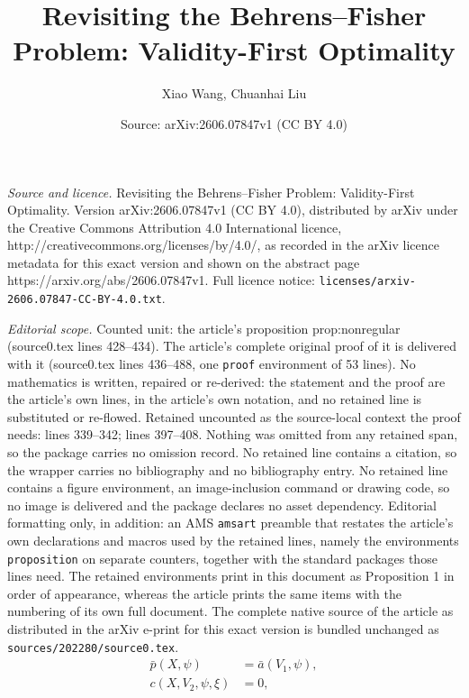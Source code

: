 \documentclass[10pt,a4paper]{amsart}
\title{Revisiting the Behrens--Fisher Problem: Validity-First Optimality}
\author{Xiao Wang, Chuanhai Liu}
\date{Source: arXiv:2606.07847v1 (CC BY 4.0)}
\begin{document}
\maketitle

\noindent\emph{Source and licence.} Revisiting the Behrens--Fisher Problem: Validity-First Optimality. Version arXiv:2606.07847v1 (CC BY 4.0), distributed by arXiv under the Creative Commons Attribution 4.0 International licence, http://creativecommons.org/licenses/by/4.0/, as recorded in the arXiv licence metadata for this exact version and shown on the abstract page https://arxiv.org/abs/2606.07847v1. Full licence notice: \texttt{licenses/arxiv-2606.07847-CC-BY-4.0.txt}.\par\smallskip

\noindent\textit{Editorial scope.} Counted unit: the article's proposition prop:nonregular (source0.tex lines 428--434). The article's complete original proof of it is delivered with it (source0.tex lines 436--488, one \texttt{proof} environment of 53 lines). No mathematics is written, repaired or re-derived: the statement and the proof are the article's own lines, in the article's own notation, and no retained line is substituted or re-flowed.  Retained uncounted as the source-local context the proof needs: lines 339--342; lines 397--408.  Nothing was omitted from any retained span, so the package carries no omission record.  No retained line contains a citation, so the wrapper carries no bibliography and no bibliography entry.  No retained line contains a figure environment, an image-inclusion command or drawing code, so no image is delivered and the package declares no asset dependency.  Editorial formatting only, in addition: an AMS \texttt{amsart} preamble that restates the article's own declarations and macros used by the retained lines, namely the environments \texttt{proposition} on separate counters, together with the standard packages those lines need.  The retained environments print in this document as Proposition 1 in order of appearance, whereas the article prints the same items with the numbering of its own full document.  The complete native source of the article as distributed in the arXiv e-print for this exact version is bundled unchanged as \texttt{sources/202280/source0.tex}.
\begin{align}
\bar p(X,\psi)&=\bar a(V_1,\psi), \label{eq:regular-interest}\\
c(X,V_2,\psi,\xi)&=0, \label{eq:regular-nuisance}
\end{align}
\end{document}
